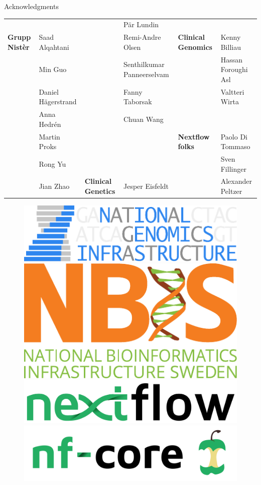 \documentclass[usepdftitle=false]{beamer}
\begin{document}
\begin{frame}{Acknowledgments}
\begin{table}
{\begin{tabular}{llllll}
															&															&								&	Pär Lundin									&								&	\\
		\textbf{Grupp Nistèr}	&	Saad Alqahtani			&														&	Remi-Andre Olsen						&	\textbf{Clinical Genomics}	&	Kenny Billiau\\
													&	Min Guo							&														&	Senthilkumar Panneerselvam	&															&	Hassan Foroughi Asl\\
													&	Daniel Hägerstrand	&														&	Fanny Taborsak							&															&	Valtteri Wirta\\
													&	Anna Hedrén					&														&	Chuan Wang									&															&	\\
													&	Martin Proks				&									&							&	\textbf{Nextflow folks}	&	Paolo Di Tommaso	\\
													&	Rong Yu							&									&							&													&	Sven Fillinger	\\
													&	Jian Zhao						&	\textbf{Clinical Genetics}		&	Jesper Eisfeldt			&		&	Alexander Peltzer	\\
		\end{tabular}}
	\end{table}
	\begin{figure}
		\includegraphics[height=.6cm]{pictures/NGI}%
		\hfill%
		\includegraphics[height=.6cm]{pictures/NBIS}%
		\hfill%
		\includegraphics[height=.6cm]{pictures/nextflow.png}%
		\hfill%
		\includegraphics[height=.6cm]{pictures/nf-core-logo}%
	\end{figure}
\end{frame}
\end{document}
